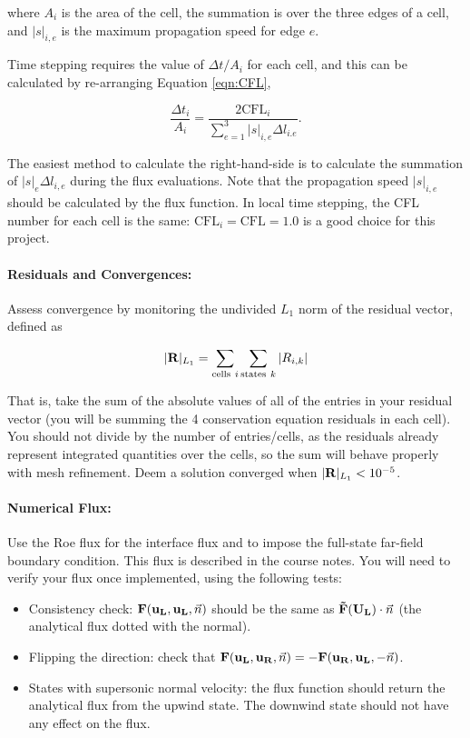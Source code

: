 where $A_i$ is the area of the cell, the summation is over the three edges of a cell, and $|s|_{i,e}$ is the
maximum propagation speed for edge $e$.

Time stepping requires the value of $\Delta t/A_i$ for each cell, and this can be calculated by re-arranging
Equation \ref{eqn:CFL},

\begin{equation}\label{eqn:time_stepping}
    \frac{\Delta t_i}{A_i} = \frac{2\text{CFL}_i}{\sum_{e=1}^{3}|s|_{i,e}\Delta l_{i.e}}.
\end{equation}

The easiest method to calculate the right-hand-side is to calculate the summation of $|s|_e \Delta l_{i,e}$ during the flux evaluations. Note that the propagation speed $|s|_{i,e}$ should be calculated by the flux function. In local time stepping, the CFL number for each cell is the same: $\text{CFL}_i = \text{CFL} = 1.0$ is a good choice for this project.

\paragraph{Residuals and Convergences:} Assess convergence by monitoring the undivided $L_1$ norm of the residual vector, defined as

\begin{equation}\label{eqn:residual_vector}
    |{\bf R}|_{L_1} = \sum_{\text{cells}\ i} \sum_{\text{states}\ k}|R_{i,k}|
\end{equation}

That is, take the sum of the absolute values of all of the entries in your residual vector (you will be summing the 4 conservation equation residuals in each cell). You should not divide by the number of entries/cells, as the residuals already represent integrated quantities over the cells, so the sum will behave properly with mesh refinement. Deem a solution converged when $|{\bf R}|_{L_1} < 10^{-5}$.

\paragraph{Numerical Flux:} Use the Roe flux for the interface flux and to impose the full-state far-field boundary condition. This flux is described in the course notes. You will need to verify your flux once implemented, using the following tests:

\begin{itemize}
    \item Consistency check: ${\bf F(u_L, u_L}, \vec{n})$ should be the same as $ {\bf \vec{F}(U_L)}\cdot \vec{n}$ (the analytical flux dotted with the normal).
    \item Flipping the direction: check that $ {\bf F(u_L, u_R} , \vec{n} ) =  {\bf-F(u_R , u_L }, -\vec{n} )$.
    \item States with supersonic normal velocity: the flux function should return the analytical flux from the upwind state. The downwind state should not have any effect on the flux.
\end{itemize}


